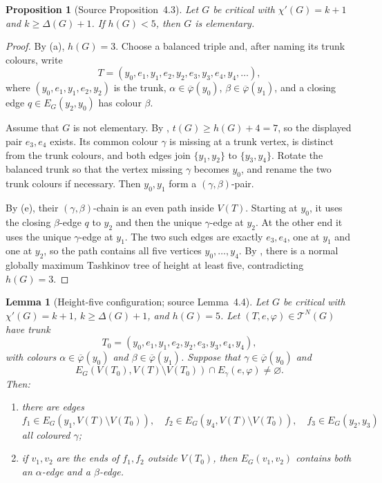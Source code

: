 \documentclass[11pt]{article}
\newtheorem{proposition}[proposition]{Proposition}
\newtheorem{lemma}[lemma]{Lemma}
\theoremstyle{definition}
\newcommand{\Tcal}{\mathcal T}
\newcommand{\set}[1]{\{#1\}}
\newcommand{\comp}{\mathbin{\setminus}}
\begin{document}
\begin{proposition}[Source Proposition~4.3]
\label{Scheide-Proposition-4.3}\label{small-height}
Let $G$ be critical with $\chi'(G)=k+1$ and $k\ge\Delta(G)+1$. If
$h(G)<5$, then $G$ is elementary.
\end{proposition}

\begin{proof}
By (a), $h(G)=3$. Choose a balanced triple and,
after naming its trunk colours, write
\[
 T=(y_0,e_1,y_1,e_2,y_2,e_3,y_3,e_4,y_4,\ldots),
\]
where $(y_0,e_1,y_1,e_2,y_2)$ is the trunk,
$\alpha\in\overline\varphi(y_0)$,
$\beta\in\overline\varphi(y_1)$, and a closing edge
$q\in E_G(y_2,y_0)$ has colour $\beta$.

Assume that $G$ is not elementary. By ,
$t(G)\ge h(G)+4=7$, so the displayed pair $e_3,e_4$ exists. Its common
colour $\gamma$ is missing at a trunk vertex, is distinct from the trunk
colours, and both edges join $\set{y_1,y_2}$ to
$\set{y_3,y_4}$. Rotate the balanced trunk so that the vertex missing
$\gamma$ becomes $y_0$, and rename the two trunk colours if necessary.
Then $y_0,y_1$ form a $(\gamma,\beta)$-pair.

By (e), their
$(\gamma,\beta)$-chain is an even path inside $V(T)$. Starting at $y_0$,
it uses the closing $\beta$-edge $q$ to $y_2$ and then the unique
$\gamma$-edge at $y_2$. At the other end it uses the unique
$\gamma$-edge at $y_1$. The two such edges are exactly $e_3,e_4$, one at
$y_1$ and one at $y_2$, so the path contains all five vertices
$y_0,\ldots,y_4$. By , there is a normal globally
maximum Tashkinov tree of height at least five, contradicting $h(G)=3$.
\end{proof}

\begin{lemma}[Height-five configuration; source Lemma~4.4]
\label{Scheide-Lemma-4.4}\label{height-five}
Let $G$ be critical with $\chi'(G)=k+1$, $k\ge\Delta(G)+1$, and
$h(G)=5$. Let $(T,e,\varphi)\in\Tcal^N(G)$ have trunk
\[
 T_0=(y_0,e_1,y_1,e_2,y_2,e_3,y_3,e_4,y_4),
\]
with colours $\alpha\in\overline\varphi(y_0)$ and
$\beta\in\overline\varphi(y_1)$. Suppose that
$\gamma\in\overline\varphi(y_0)$ and
\[
 E_G(V(T_0),V(T)\comp V(T_0))\cap E_\gamma(e,\varphi)
 \ne\varnothing.
\]
Then:
\begin{enumerate}[label=\textup{(\arabic*)}]
\item there are edges
\[
 f_1\in E_G(y_1,V(T)\comp V(T_0)),\quad
 f_2\in E_G(y_4,V(T)\comp V(T_0)),\quad
 f_3\in E_G(y_2,y_3)
\]
all coloured $\gamma$;
\item if $v_1,v_2$ are the ends of $f_1,f_2$ outside $V(T_0)$, then
      $E_G(v_1,v_2)$ contains both an $\alpha$-edge and a $\beta$-edge.
\end{enumerate}
\end{lemma}
\end{document}
